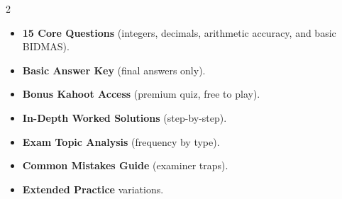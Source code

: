 \documentclass[11pt,a4paper]{article}
\newcommand{\FullReleaseDate}{April 30, 2026}
\begin{document}
\vspace{8pt}

\begin{multicols}{2}
  \begin{tcolorbox}[card, title=\sffamily\bfseries\textcolor{white}{\faHandPointDown\ TODAY (Simplified Version)}, colbacktitle=mainblue, boxed title style={sharp corners, boxrule=0pt}]
    \begin{itemize}[leftmargin=1.2em, itemsep=2pt]
      \item \small \textbf{15 Core Questions} (integers, decimals, arithmetic accuracy, and basic BIDMAS).
      \item \small \textbf{Basic Answer Key} (final answers only).
      \item \small \textbf{Bonus Kahoot Access} (premium quiz, free to play).
    \end{itemize}
  \end{tcolorbox}

  \columnbreak

  \begin{tcolorbox}[card, title=\sffamily\bfseries\textcolor{white}{\faRocket\ ON \FullReleaseDate\ (Full Upgrade)}, colbacktitle=mainblue, boxed title style={sharp corners, boxrule=0pt}]
    \begin{itemize}[leftmargin=1.2em, itemsep=2pt]
      \item \small \textbf{In-Depth Worked Solutions} (step-by-step).
      \item \small \textbf{Exam Topic Analysis} (frequency by type).
      \item \small \textbf{Common Mistakes Guide} (examiner traps).
      \item \small \textbf{Extended Practice} variations.
    \end{itemize}
  \end{tcolorbox}
\end{multicols}
\end{document}
